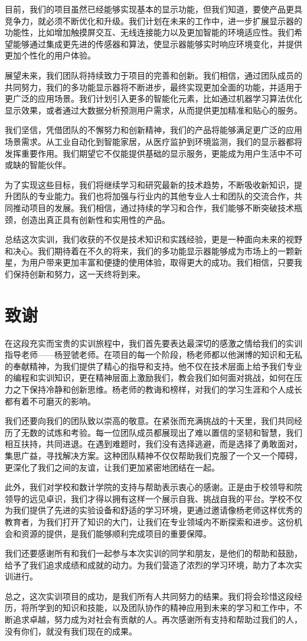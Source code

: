 \documentclass{textreportclass}  %
\begin{document}
目前，我们的项目虽然已经能够实现基本的显示功能，但我们知道，要使产品更具竞争力，就必须不断优化和升级。我们计划在未来的工作中，进一步扩展显示器的功能性，比如增加触摸屏交互、无线连接能力以及更加智能的环境适应性。我们希望能够通过集成更先进的传感器和算法，使显示器能够实时响应环境变化，并提供更加个性化的用户体验。

展望未来，我们团队将持续致力于项目的完善和创新。我们相信，通过团队成员的共同努力，我们的多功能显示器将不断进步，最终实现更加全面的功能，并适用于更广泛的应用场景。我们计划引入更多的智能化元素，比如通过机器学习算法优化显示效果，或者通过大数据分析预测用户需求，从而提供更加精准和贴心的服务。

我们坚信，凭借团队的不懈努力和创新精神，我们的产品将能够满足更广泛的应用场景需求。从工业自动化到智能家居，从医疗监护到环境监测，我们的显示器都将发挥重要作用。我们期望它不仅能提供基础的显示服务，更能成为用户生活中不可或缺的智能伙伴。

为了实现这些目标，我们将继续学习和研究最新的技术趋势，不断吸收新知识，提升团队的专业能力。我们也将加强与行业内的其他专业人士和团队的交流合作，共同推动项目的发展。我们相信，通过持续的学习和合作，我们能够不断突破技术瓶颈，创造出真正具有创新性和实用性的产品。

总结这次实训，我们收获的不仅是技术知识和实践经验，更是一种面向未来的视野和决心。我们期待着在不久的将来，我们的多功能显示器能够成为市场上的一颗新星，为用户带来更加丰富和便捷的使用体验，取得更大的成功。我们相信，只要我们保持创新和努力，这一天终将到来。
	
	
\section{致谢}					     	  %
在这段充实而宝贵的实训旅程中，我们首先要表达最深切的感激之情给我们的实训指导老师——杨翌虢老师。在项目的每一个阶段，杨老师都以他渊博的知识和无私的奉献精神，为我们提供了精心的指导和支持。他不仅在技术层面上给予我们专业的编程和实训知识，更在精神层面上激励我们，教会我们如何面对挑战，如何在压力之下保持冷静和创新思维。杨老师的教诲和榜样，对我们的学习生涯和个人成长都有着不可磨灭的影响。

我们还要向我们的团队致以崇高的敬意。在紧张而充满挑战的十天里，我们共同经历了无数的试炼和考验。每一位团队成员都展现出了难以置信的坚韧和智慧，我们相互扶持，共同进退。在遇到难题时，我们没有选择逃避，而是选择了勇敢面对，集思广益，寻找解决方案。这种团队精神不仅仅帮助我们克服了一个又一个障碍，更深化了我们之间的友谊，让我们更加紧密地团结在一起。

此外，我们对学校和数计学院的支持与帮助表示衷心的感谢。正是由于校领导和院领导的远见卓识，我们才得以拥有这样一个展示自我、挑战自我的平台。学校不仅为我们提供了先进的实验设备和舒适的学习环境，更通过邀请像杨老师这样优秀的教育者，为我们打开了知识的大门，让我们在专业领域内不断探索和进步。这份机会和资源的提供，是我们能够顺利完成项目的重要保障。

我们还要感谢所有和我们一起参与本次实训的同学和朋友，是他们的帮助和鼓励，给予了我们追求成绩和成就的动力。为我们营造了浓烈的学习环境，助力了本次实训进行。

总之，这次实训项目的成功，是我们所有人共同努力的结果。我们将会珍惜这段经历，将所学到的知识和技能，以及团队协作的精神应用到未来的学习和工作中，不断追求卓越，努力成为对社会有贡献的人。再次感谢所有支持和帮助过我们的人，没有你们，就没有我们现在的成果。


	
\end{document}
